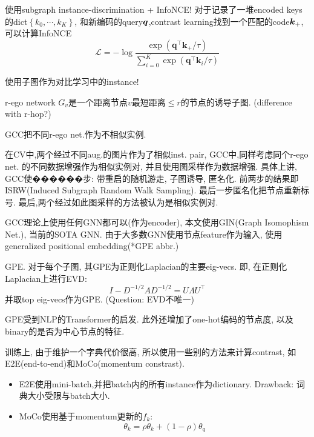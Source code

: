 \documentclass{article}
\begin{document}
\begin{flushleft}

 使用subgraph instance-discrimination + InfoNCE! 对于记录了一堆encoded keys的dict$\left\{k_{0}, \cdots, k_{K}\right\}$, 和新编码的query$\boldsymbol{q}$,contrast learning找到一个匹配的code$\boldsymbol{k}_+$,可以计算InfoNCE
\begin{equation}
    \mathcal{L}=-\log \frac{\exp \left(\boldsymbol{q}^{\top} \boldsymbol{k}_{+} / \tau\right)}{\sum_{i=0}^{K} \exp \left(\boldsymbol{q}^{\top} \boldsymbol{k}_{i} / \tau\right)}
\end{equation}

使用子图作为对比学习中的instance!
\begin{definition}
    r-ego network $G_v$是一个距离节点$v$最短距离$\le r$的节点的诱导子图. (difference with r-hop?)
\end{definition}
GCC把不同r-ego net.作为不相似实例.

在CV中,两个经过不同aug.的图片作为了相似inst. pair, GCC中,同样考虑同个r-ego net. 的不同数据增强作为相似实例对, 并且使用图采样作为数据增强. 具体上讲, GCC使������步: 带重启的随机游走, 子图诱导, 匿名化. 前两步的结果即ISRW(Induced Subgraph Random Walk Sampling). 最后一步匿名化把节点重新标号. 最后,两个经过如此图采样的方法被认为是相似实例对.

GCC理论上使用任何GNN都可以(作为encoder), 本文使用GIN(Graph Isomophism Net.), 当前的SOTA GNN. 由于大多数GNN使用节点feature作为输入, 使用generalized positional embedding(*GPE abbr.)

\begin{definition}
    GPE. 对于每个子图, 其GPE为正则化Laplacian的主要eig-vecs. 即, 在正则化Laplacian上进行EVD:
    \begin{equation}
        I-D^{-1 / 2} A D^{-1 / 2}=U \Lambda U^{\top}
    \end{equation}
    并取top eig-vecs作为GPE.
    (Question: EVD不唯一)
\end{definition}

GPE受到NLP的Transformer的启发. 此外还增加了one-hot编码的节点度, 以及binary的是否为中心节点的特征.

训练上, 由于维护一个字典代价很高, 所以使用一些别的方法来计算contrast, 如E2E(end-to-end)和MoCo(momentum constrast). \begin{itemize}
    \item E2E使用mini-batch,并把batch内的所有instance作为dictionary. Drawback: 词典大小受限与batch大小.
    \item MoCo使用基于momentum更新的$f_k$: 
    $$
    \theta_k = \rho \theta_k + (1-\rho)\theta_q
    $$
\end{itemize}

\end{flushleft}
\end{document}
